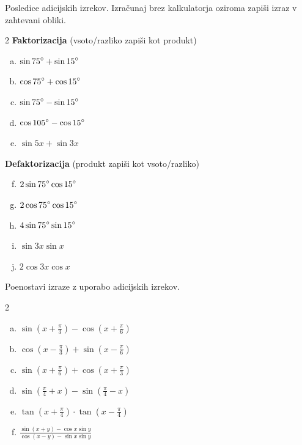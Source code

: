\documentclass[a4paper,12pt]{letter}
\newcounter{tocke}
\begin{document}
\begin{naloga}[\hfill $\tockeE$] \addtocounter{tocke}{\numexpr\tockeE\relax}
Posledice adicijskih izrekov. Izra\v{c}unaj brez kalkulatorja oziroma zapi\v{s}i izraz v zahtevani obliki.
\begin{multicols}{2}
\textbf{Faktorizacija} (vsoto/razliko zapi\v{s}i kot produkt)
\begin{enumerate}[a)]
\item $\displaystyle \sin75\degree+\sin15\degree$
\item $\displaystyle \cos75\degree+\cos15\degree$
\item $\displaystyle \sin75\degree-\sin15\degree$
\item $\displaystyle \cos105\degree-\cos15\degree$
\item $\displaystyle \sin5x+\sin3x$
\end{enumerate}
\columnbreak
\textbf{Defaktorizacija} (produkt zapi\v{s}i kot vsoto/razliko)
\begin{enumerate}[a)]\setcounter{enumi}{5}
\item $\displaystyle 2\sin75\degree\cos15\degree$
\item $\displaystyle 2\cos75\degree\cos15\degree$
\item $\displaystyle 4\sin75\degree\sin15\degree$
\item $\displaystyle \sin3x\sin x$
\item $\displaystyle 2\cos3x\cos x$
\end{enumerate}
\end{multicols}
\end{naloga}

\begin{naloga}[\hfill $\tockeF$] \addtocounter{tocke}{\numexpr\tockeF\relax}
Poenostavi izraze z uporabo adicijskih izrekov.
\begin{multicols}{2}
\begin{enumerate}[a)]
\item $\displaystyle \sin\left(x+\frac{\pi}{3}\right)-\cos\left(x+\frac{\pi}{6}\right)$
\item $\displaystyle \cos\left(x-\frac{\pi}{3}\right)+\sin\left(x-\frac{\pi}{6}\right)$
\item $\displaystyle \sin\left(x+\frac{\pi}{6}\right)+\cos\left(x+\frac{\pi}{3}\right)$
\end{enumerate}
\columnbreak
\begin{enumerate}[a)]\setcounter{enumi}{3}
\item $\displaystyle \sin\left(\frac{\pi}{4}+x\right)-\sin\left(\frac{\pi}{4}-x\right)$
\item $\displaystyle \tan\left(x+\frac{\pi}{4}\right)\cdot\tan\left(x-\frac{\pi}{4}\right)$
\item $\displaystyle \frac{\sin(x+y)-\cos x\sin y}{\cos(x-y)-\sin x\sin y}$
\end{enumerate}
\end{multicols}
\end{naloga}
\end{document}
